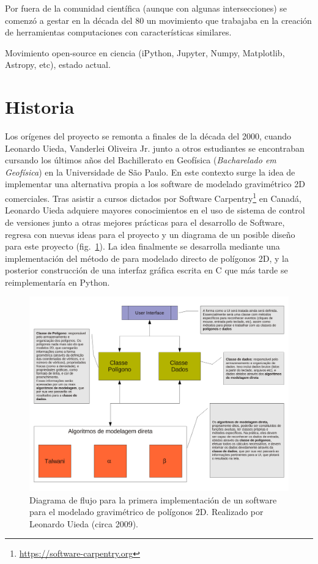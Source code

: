 Por fuera de la comunidad científica (aunque con algunas intersecciones) se
comenzó a gestar en la década del 80 un movimiento que trabajaba en la creación
de herramientas computaciones con características similares.

Movimiento open-source en ciencia (iPython, Jupyter, Numpy, Matplotlib,
Astropy, etc), estado actual.


\section{Historia}

Los orígenes del proyecto se remonta a finales de la década del 2000, cuando
Leonardo Uieda, Vanderlei Oliveira Jr. junto a otros estudiantes se encontraban
cursando los últimos años del Bachillerato en Geofísica (\emph{Bacharelado em
Geofísica}) en la Universidade de São Paulo.
En este contexto surge la idea de implementar una alternativa propia a los
software de modelado gravimétrico 2D comerciales.
Tras asistir a cursos dictados por
Software Carpentry\footnote{%
    \url{https://software-carpentry.org}
}
en Canadá, Leonardo Uieda adquiere mayores conocimientos en el uso de sistema
de control de versiones junto a otras mejores prácticas para el desarrollo de
Software, regresa con nuevas ideas para el proyecto y un diagrama de un posible
diseño para este proyecto (fig.~\ref{fig:talwani-idea}).
La idea finalmente se desarrolla mediante
una implementación del método de \citet{talwani1959} para
modelado directo de polígonos 2D, y la posterior construcción de una interfaz
gráfica escrita en C que más tarde se reimplementaría en Python.

\begin{figure}
    \centering
    \includegraphics[width=\linewidth]{figs/fluxo-simples.pdf}
    \caption{
        Diagrama de flujo para la primera implementación de un software para el
        modelado gravimétrico de polígonos 2D. Realizado por Leonardo Uieda
        (circa 2009).
    }
    \label{fig:talwani-idea}
\end{figure}

